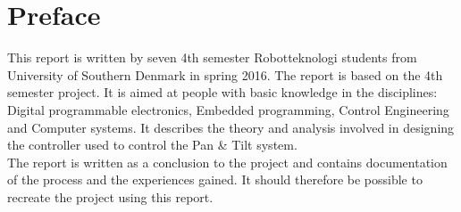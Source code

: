 \section*{Preface}

This report is written by seven 4th semester Robotteknologi students from University of Southern Denmark in spring 2016. The report is based on the 4th semester project.
It is aimed at people with basic knowledge in the disciplines: Digital programmable electronics, Embedded programming, Control Engineering and Computer systems.
It describes the theory and analysis involved in designing the controller used to control the Pan \& Tilt system.\\
The report is written as a conclusion to the project and contains documentation of the process and the experiences gained. It should therefore be possible to recreate the project using this report.